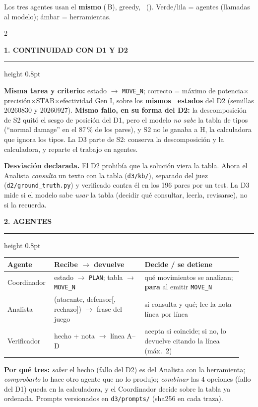 \documentclass[10pt,a4paper]{extarticle}
\newcommand{\heading}[1]{%
  \par\vspace{0.8mm}\noindent
  {\color{navy}\bfseries\MakeUppercase{#1}}\par\vspace{0.2mm}
  {\color{amber}\hrule height 0.8pt}\vspace{0.6mm}\noindent\ignorespaces}
\begin{document}
{\centering\scriptsize Los tres agentes usan el \textbf{mismo} \texttt{\modelId} (\nParams\,B), greedy, \hw\ (\libs). Verde/lila = agentes (llamadas al modelo); \'ambar = herramientas.\par}

\hspace{1cm}
\begin{multicols}{2}
\heading{1. Continuidad con D1 y D2}
\textbf{Misma tarea y criterio:} estado $\to$ \texttt{MOVE\_N}; correcto = m\'aximo de potencia$\times$precisi\'on$\times$STAB$\times$efectividad Gen I, sobre los \textbf{mismos \nAll\ estados} del D2 (semillas 20260830 y 20260927). \textbf{Mismo fallo, en su forma del D2:} la descomposici\'on de S2 quit\'o el sesgo de posici\'on del D1, pero el modelo \emph{no sabe} la tabla de tipos (``normal damage'' en el 87\,\% de los pares), y S2 no le ganaba a H, la calculadora que ignora los tipos. La D3 parte de S2: conserva la descomposici\'on y la calculadora, y reparte el trabajo en agentes.

\textbf{Desviaci\'on declarada.} El D2 prohib\'ia que la soluci\'on viera la tabla. Ahora el Analista \emph{consulta} un texto con la tabla (\texttt{d3/kb/}), separado del juez (\texttt{d2/ground\_truth.py}) y verificado contra \'el en los 196 pares por un test. La D3 mide si el modelo sabe \emph{usar} la tabla (decidir qu\'e consultar, leerla, revisarse), no si la recuerda.

\heading{2. Agentes}
{\centering\scriptsize
\begin{tabular}{@{}L{0.17\linewidth}L{0.37\linewidth}L{0.40\linewidth}@{}}
\toprule
\textbf{Agente} & \textbf{Recibe $\to$ devuelve} & \textbf{Decide / se detiene}\\
\midrule
Coordinador & estado $\to$ \texttt{PLAN}; tabla $\to$ \texttt{MOVE\_N} & qu\'e movimientos se analizan; \textbf{para} al emitir \texttt{MOVE\_N}\\
Analista & (atacante, defensor[, rechazo]) $\to$ frase del juego & si consulta y qu\'e; lee la nota l\'inea por l\'inea\\
Verificador & hecho + nota $\to$ l\'inea A--D & acepta si coincide; si no, lo devuelve citando la l\'inea (m\'ax.\ 2)\\
\bottomrule
\end{tabular}\par}

\textbf{Por qu\'e tres:} \emph{saber} el hecho (fallo del D2) es del Analista con la herramienta; \emph{comprobarlo} lo hace otro agente que no lo produjo; \emph{combinar} las 4 opciones (fallo del D1) queda en la calculadora, y el Coordinador decide sobre la tabla ya ordenada. Prompts versionados en \texttt{d3/prompts/} (sha256 en cada traza).


\end{multicols}
\end{document}
